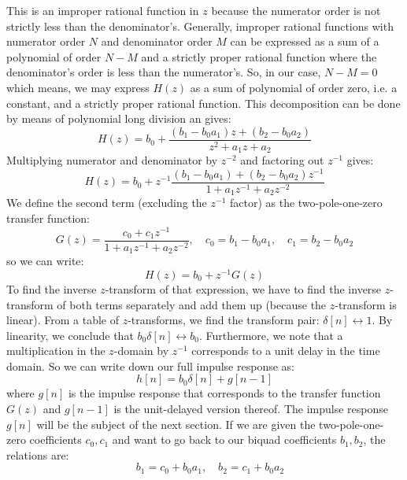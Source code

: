 This is an improper rational function in $z$ because the numerator order is not strictly less than the denominator's. Generally, improper rational functions with numerator order $N$ and denominator order $M$ can be expressed as a sum of a polynomial of order $N-M$ and a strictly proper rational function where the denominator's order is less than the numerator's. So, in our case, $N-M = 0$ which means, we may express $H(z)$ as a sum of polynomial of order zero, i.e. a constant, and a strictly proper rational function. This decomposition can be done by means of polynomial long division an gives:
\begin{equation}
 H(z) = b_0 +  \frac{(b_1-b_0 a_1) z + (b_2-b_0 a_2)} {z^2 + a_1 z + a_2}
\end{equation}
Multiplying numerator and denominator by $z^{-2}$ and factoring out $z^{-1}$ gives:
\begin{equation}
 H(z) = b_0 + z^{-1} \frac{(b_1-b_0 a_1) + (b_2-b_0 a_2) z^{-1}} {1 + a_1 z^{-1} + a_2 z^{-2}}
\end{equation}
We define the second term (excluding the $z^{-1}$ factor) as the two-pole-one-zero transfer function:
\begin{equation}
 G(z) = \frac{c_0 + c_1 z^{-1}} {1 + a_1 z^{-1} + a_2 z^{-2}}, \quad c_0 = b_1-b_0 a_1, \quad c_1 = b_2-b_0 a_2
\end{equation}
so we can write:
\begin{equation}
 H(z) = b_0 + z^{-1} G(z)
\end{equation}
To find the inverse $z$-transform of that expression, we have to find the inverse $z$-transform of both terms separately and add them up (because the $z$-transform is linear). From a table of $z$-transforms, we find the transform pair: $\delta[n] \leftrightarrow 1$. By linearity, we conclude that $b_0 \delta[n] \leftrightarrow b_0$. Furthermore, we note that a multiplication in the $z$-domain by $z^{-1}$ corresponds to a unit delay in the time domain. So we can write down our full impulse response as:
\begin{equation}
\label{Eq:BiquadImpulseResponse}
\boxed
{
 h[n] = b_0 \delta[n] + g[n-1]
 }
\end{equation}
where $g[n]$ is the impulse response that corresponds to the transfer function $G(z)$ and $g[n-1]$ is the unit-delayed version thereof. The impulse response $g[n]$ will be the subject of the next section. If we are given the two-pole-one-zero coefficients $c_0, c_1$ and want to go back to our biquad coefficients $b_1, b_2$, the relations are:
\begin{equation}
 \quad b_1 = c_0 + b_0 a_1, \quad b_2 = c_1 + b_0 a_2
\end{equation}


